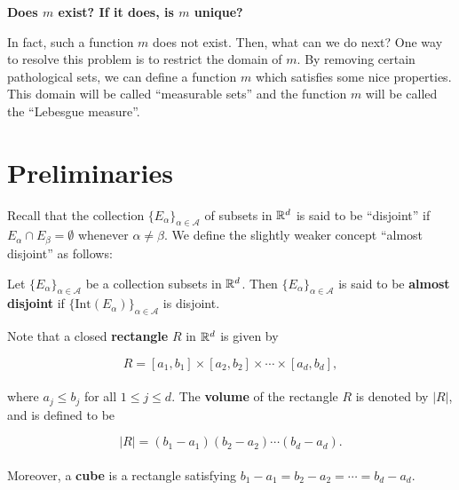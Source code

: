 \documentclass[12pt, a4paper, openany, twoside]{book}
\theoremstyle{definition}
\theoremstyle{remark}
\newcommand{\Int}{{\mathrm{Int}}}
\theoremstyle{plain}
\numberwithin{equation}{section}
\begin{document}
\vspace{5mm}
\large\textbf{Does $m$ exist? If it does, is $m$ unique?}
\vspace{5mm}
\normalsize

In fact, such a function $m$ does not exist. Then, what can we do next? One way to resolve this problem is to restrict the domain of $m$. 
By removing certain pathological sets, we can define a function $m$ which satisfies some nice properties. This domain will be called ``measurable sets'' and the function $m$ will be called the ``Lebesgue measure''.

\vspace{5mm}
\section{Preliminaries}\mbox{}

Recall that the collection $\{E_\alpha\}_{\alpha\in\mathcal{A}}$ of subsets in ${\mathbb {R}}^d$ is said to be ``disjoint'' if $E_\alpha\cap E_\beta=\emptyset$ whenever $\alpha\neq\beta$. We define the slightly weaker concept ``almost disjoint'' as follows:

\vspace{5mm}
\begin{tcolorbox}[colback=yellow!10!white,colframe=blue!75!black,title=Definition 1.1.1]\label{Definition 1.1.1}
    Let $\{E_\alpha\}_{\alpha\in\mathcal{A}}$ be a collection subsets in ${\mathbb {R}}^d$. Then $\{E_\alpha\}_{\alpha\in\mathcal{A}}$ is said to be \textbf{almost disjoint} if $\{\Int(E_\alpha)\}_{\alpha\in\mathcal{A}}$ is disjoint.
\end{tcolorbox}
\vspace{5mm}

Note that a closed \textbf{rectangle} $R$ in ${\mathbb {R}}^d$ is given by 

\[R=[a_1,b_1]\times [a_2,b_2]\times\cdots\times[a_d,b_d],\]
\\
where $a_j\leq b_j$ for all $1\leq j\leq d$. The \textbf{volume} of the rectangle $R$ is denoted by $|R|$, and is defined to be

\[|R|=(b_1-a_1)(b_2-a_2)\cdots (b_d-a_d).\]
\\
\indent Moreover, a \textbf{cube} is a rectangle satisfying $b_1-a_1=b_2-a_2=\cdots=b_d-a_d$.

\vspace{5mm}
\end{document}
